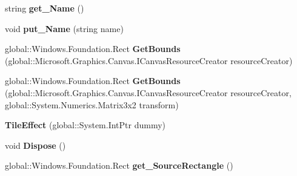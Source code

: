 \begin{DoxyCompactItemize}
\item 
\mbox{\label{class_microsoft_1_1_graphics_1_1_canvas_1_1_effects_1_1_tile_effect_a8b97f1a7d4ea0db3d1fc42844efed9f2}} 
string {\bfseries get\+\_\+\+Name} ()
\item 
\mbox{\label{class_microsoft_1_1_graphics_1_1_canvas_1_1_effects_1_1_tile_effect_af926c062b59f800140ad8bf045385da8}} 
void {\bfseries put\+\_\+\+Name} (string name)
\item 
\mbox{\label{class_microsoft_1_1_graphics_1_1_canvas_1_1_effects_1_1_tile_effect_ab750c6e9b586d8a61f8aa73d8c345adc}} 
global\+::\+Windows.\+Foundation.\+Rect {\bfseries Get\+Bounds} (global\+::\+Microsoft.\+Graphics.\+Canvas.\+I\+Canvas\+Resource\+Creator resource\+Creator)
\item 
\mbox{\label{class_microsoft_1_1_graphics_1_1_canvas_1_1_effects_1_1_tile_effect_abe0663f59fe2ba4b80be6f46ca4198c8}} 
global\+::\+Windows.\+Foundation.\+Rect {\bfseries Get\+Bounds} (global\+::\+Microsoft.\+Graphics.\+Canvas.\+I\+Canvas\+Resource\+Creator resource\+Creator, global\+::\+System.\+Numerics.\+Matrix3x2 transform)
\item 
\mbox{\label{class_microsoft_1_1_graphics_1_1_canvas_1_1_effects_1_1_tile_effect_aa107fd2365bf30bb4bc757c8f23570cb}} 
{\bfseries Tile\+Effect} (global\+::\+System.\+Int\+Ptr dummy)
\item 
\mbox{\label{class_microsoft_1_1_graphics_1_1_canvas_1_1_effects_1_1_tile_effect_a82911fbdb206a47dd070948da25b15b2}} 
void {\bfseries Dispose} ()
\item 
\mbox{\label{class_microsoft_1_1_graphics_1_1_canvas_1_1_effects_1_1_tile_effect_ab1844baf6fd7b1291017af32256cb757}} 
global\+::\+Windows.\+Foundation.\+Rect {\bfseries get\+\_\+\+Source\+Rectangle} ()
\item 

\end{DoxyCompactItemize}

